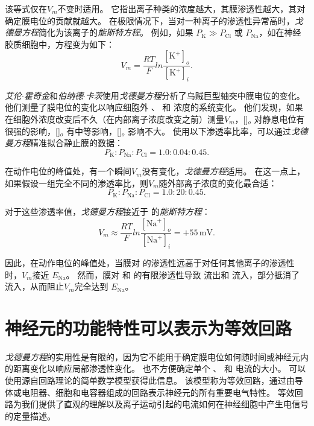 该等式仅在$V_m$不变时适用。
它指出离子种类的浓度越大，其膜渗透性越大，其对确定膜电位的贡献就越大。
在极限情况下，当对一种离子的渗透性异常高时，\textit{戈德曼方程}简化为该离子的\textit{能斯特方程}。 
例如，如果 $P_\text{K} \gg P_\text{Cl}$ 或 $P_\text{Na}$，如在神经胶质细胞中，方程变为如下：
\begin{equation} \label{eq:9_glial_cell_equation}
	V_m = \frac{RT}{F}
		ln \frac{[\text{K}^+]_o}{[\text{K}^+]_i}.
\end{equation}


\textit{艾伦$\cdot$霍奇金}和\textit{伯纳德$\cdot$卡茨}使用\textit{戈德曼方程}分析了乌贼巨型轴突中膜电位的变化。
他们测量了膜电位的变化以响应细胞外 、 和  浓度的系统变化。
他们发现，如果在细胞外浓度改变后不久（在内部离子浓度改变之前）测量$V_m$，[]$_o$ 对静息电位有很强的影响，[]$_o$ 有中等影响，[]$_o$ 影响不大。 
使用以下渗透率比率，可以通过\textit{戈德曼方程}精准拟合静止膜的数据：
\begin{equation}
	P_\text{K} : P_\text{Na} : P_\text{Cl} = 1.0 : 0.04 : 0.45.
\end{equation}

在动作电位的峰值处，有一个瞬间$V_m$没有变化，\textit{戈德曼方程}适用。 
在这一点上，如果假设一组完全不同的渗透率比，则$V_m$随外部离子浓度的变化最合适：
\begin{equation}
	P_\text{K} : P_\text{Na} : P_\text{Cl} = 1.0 : 20 : 0.45.
\end{equation}


对于这些渗透率值，\textit{戈德曼方程}接近于  的\textit{能斯特方程}：
\begin{equation}
	V_m \approx \frac{RT}{F} 
			ln \frac{[\text{Na}^+]_o}{[\text{Na}^+]_i} =
			+ 55 \, \text{mV}.
\end{equation}


因此，在动作电位的峰值处，当膜对  的渗透性远高于对任何其他离子的渗透性时，$V_m$接近 $E_\text{Na}$。 
然而，膜对  和  的有限渗透性导致  流出和  流入，部分抵消了  流入，从而阻止$V_m$完全达到 $E_\text{Na}$。



\section{神经元的功能特性可以表示为等效回路}

\textit{戈德曼方程}的实用性是有限的，因为它不能用于确定膜电位如何随时间或神经元内的距离变化以响应局部渗透性变化。
也不方便确定单个 、 和  电流的大小。
可以使用源自回路理论的简单数学模型获得此信息。
该模型称为等效回路，通过由导体或电阻器、细胞和电容器组成的回路表示神经元的所有重要电气特性。
等效回路为我们提供了直观的理解以及离子运动引起的电流如何在神经细胞中产生电信号的定量描述。


